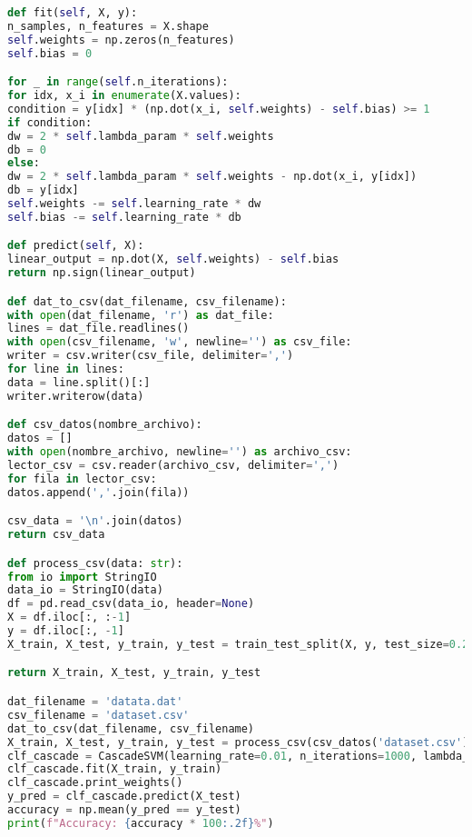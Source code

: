 \documentclass[12pt]{article}
\begin{document}
\begin{lstlisting}[language=Python]
def fit(self, X, y):
n_samples, n_features = X.shape
self.weights = np.zeros(n_features)
self.bias = 0

for _ in range(self.n_iterations):
for idx, x_i in enumerate(X.values):
condition = y[idx] * (np.dot(x_i, self.weights) - self.bias) >= 1
if condition:
dw = 2 * self.lambda_param * self.weights
db = 0
else:
dw = 2 * self.lambda_param * self.weights - np.dot(x_i, y[idx])
db = y[idx]
self.weights -= self.learning_rate * dw
self.bias -= self.learning_rate * db

def predict(self, X):
linear_output = np.dot(X, self.weights) - self.bias
return np.sign(linear_output)

def dat_to_csv(dat_filename, csv_filename):
with open(dat_filename, 'r') as dat_file:
lines = dat_file.readlines()
with open(csv_filename, 'w', newline='') as csv_file:
writer = csv.writer(csv_file, delimiter=',')
for line in lines:
data = line.split()[:]
writer.writerow(data)

def csv_datos(nombre_archivo):
datos = []
with open(nombre_archivo, newline='') as archivo_csv:
lector_csv = csv.reader(archivo_csv, delimiter=',')
for fila in lector_csv:
datos.append(','.join(fila))

csv_data = '\n'.join(datos)
return csv_data

def process_csv(data: str):
from io import StringIO
data_io = StringIO(data)
df = pd.read_csv(data_io, header=None)
X = df.iloc[:, :-1]
y = df.iloc[:, -1]
X_train, X_test, y_train, y_test = train_test_split(X, y, test_size=0.2, random_state=42)

return X_train, X_test, y_train, y_test

dat_filename = 'datata.dat'
csv_filename = 'dataset.csv'
dat_to_csv(dat_filename, csv_filename)
X_train, X_test, y_train, y_test = process_csv(csv_datos('dataset.csv'))
clf_cascade = CascadeSVM(learning_rate=0.01, n_iterations=1000, lambda_param=0.1)
clf_cascade.fit(X_train, y_train)
clf_cascade.print_weights()
y_pred = clf_cascade.predict(X_test)
accuracy = np.mean(y_pred == y_test)
print(f"Accuracy: {accuracy * 100:.2f}%")


\end{lstlisting}

\clearpage
\end{document}
